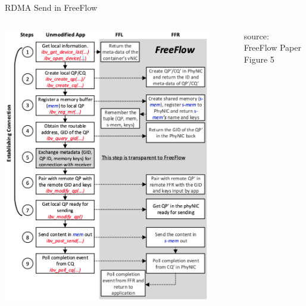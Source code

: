 \documentclass{beamer}
\begin{document}
\begin{frame}{RDMA Send in FreeFlow}
    \begin{columns}
      \resizebox{\textwidth}{!}{
          \begin{tikzpicture}[x=0.75pt,y=0.75pt,yscale=-1,xscale=1]
              
          \end{tikzpicture}
      }
        \includegraphics[width=0.9\textwidth]{freeflowrdmasend.png}
        \vspace{-10pt}
        \begin{center}
            \fontsize{4pt}{4pt}\selectfont source: FreeFlow Paper Figure 5
        \end{center}
    \end{columns}
\end{frame}
\end{document}
